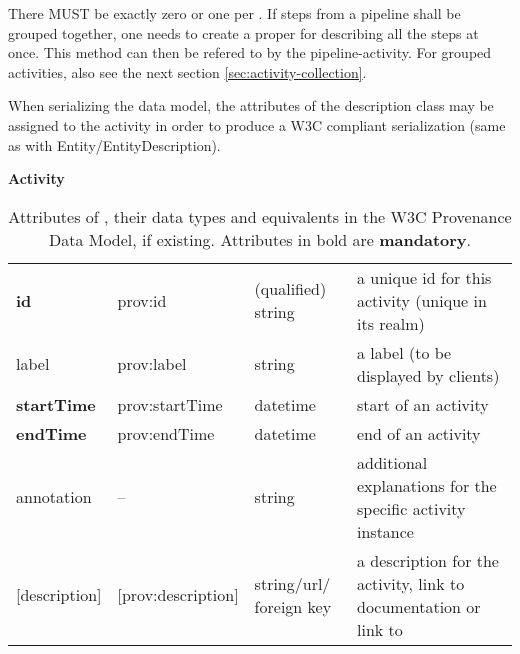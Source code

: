 There MUST be exactly zero or  one  per . If steps from a 
pipeline shall be grouped together, one needs to create a proper 
 for describing all the steps at once. This method can then 
be refered to by the pipeline-activity. For grouped activities, also see the 
next section \ref{sec:activity-collection}.

When serializing the data model, the attributes
of the description class may be assigned to the activity in order to produce 
a W3C compliant serialization (same as with Entity/EntityDescription).

\begin{table}[h]

\small
{}\textwidth

\textbf{\normalsize Activity}\vspace{0.25em}\\
\begin{tabulary}{1.0\textwidth}{@{}lp{2.5cm}p{2cm}L@{}}
\toprule
{} &  &  & \\
\midrule
\textbf{id} & prov:id  & (qualified) string & a unique id for this activity (unique in its realm)\\
label        & prov:label  & string & a label (to be displayed by clients)\\
\textbf{startTime} & prov:startTime & datetime & start of an activity\\
\textbf{endTime} & prov:endTime  & datetime & end of an activity\\
annotation        & --  & string & additional explanations for the specific activity instance\\
{[description]}  & [prov:description] & string/url/ foreign key & a description for the activity, 
				link to documentation or link to \\
\bottomrule
\end{tabulary}
\caption{Attributes of , their data types and equivalents in the W3C Provenance 
Data Model, if existing. Attributes in bold are \textbf{mandatory}.}
\end{table}


